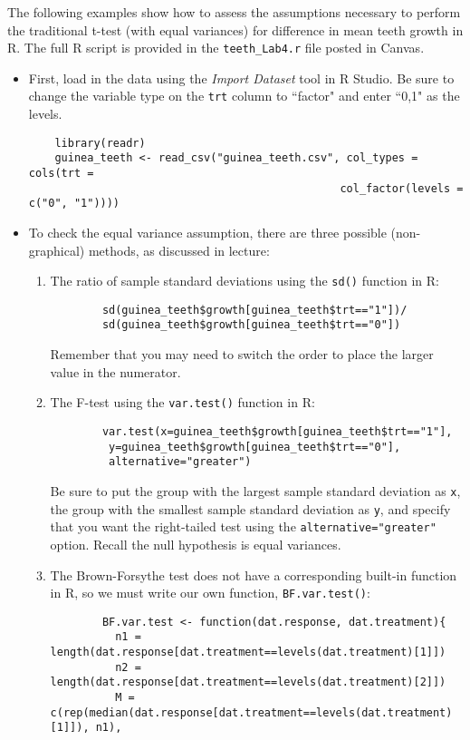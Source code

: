 \documentclass[11pt]{article}
\begin{document}
The following examples show how to assess the assumptions necessary to perform the traditional t-test (with equal variances) for difference in mean teeth growth in R. The full R script is provided in the \texttt{teeth\_Lab4.r} file posted in Canvas.
\begin{itemize}
	\item First, load in the data using the \textit{Import Dataset} tool in R Studio. Be sure to change the variable type on the \texttt{trt} column to ``factor" and enter ``0,1" as the levels.
	\begin{verbatim}
	library(readr)
	guinea_teeth <- read_csv("guinea_teeth.csv", col_types = cols(trt = 
	                                            col_factor(levels = c("0", "1"))))
	\end{verbatim}
	\item To check the equal variance assumption, there are three possible (non-graphical) methods, as discussed in lecture:
	\begin{enumerate}
		\item The ratio of sample standard deviations using the \texttt{sd()} function in R:
		\begin{verbatim}
		sd(guinea_teeth$growth[guinea_teeth$trt=="1"])/
  		sd(guinea_teeth$growth[guinea_teeth$trt=="0"])
		\end{verbatim}
		Remember that you may need to switch the order to place the larger value in the numerator.
		\item The F-test using the \texttt{var.test()} function in R:
		\begin{verbatim}
		var.test(x=guinea_teeth$growth[guinea_teeth$trt=="1"],
         y=guinea_teeth$growth[guinea_teeth$trt=="0"], 
         alternative="greater")
		\end{verbatim}
		Be sure to put the group with the largest sample standard deviation as \texttt{x}, the group with the smallest sample standard deviation as \texttt{y}, and specify that you want the right-tailed test using the \texttt{alternative="greater"} option. Recall the null hypothesis is equal variances.
		\item The Brown-Forsythe test does not have a corresponding built-in function in R, so we must write our own function, \texttt{BF.var.test()}:
		\begin{verbatim}
		BF.var.test <- function(dat.response, dat.treatment){
		  n1 = length(dat.response[dat.treatment==levels(dat.treatment)[1]])
		  n2 = length(dat.response[dat.treatment==levels(dat.treatment)[2]])
		  M = c(rep(median(dat.response[dat.treatment==levels(dat.treatment)[1]]), n1),

\end{verbatim}
\end{enumerate}
\end{itemize}
\end{document}
